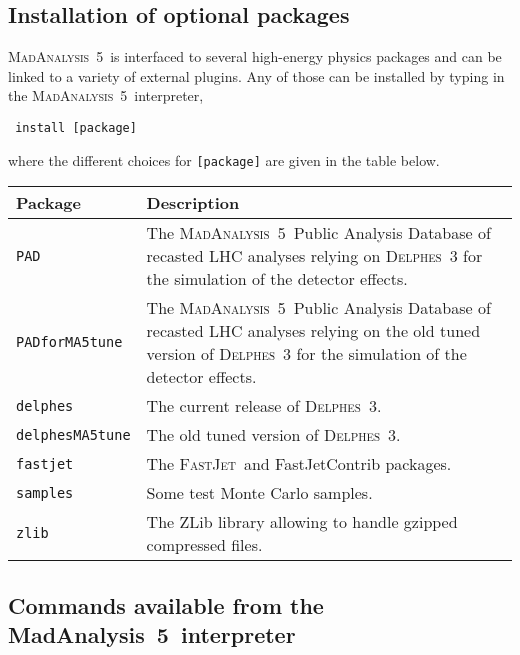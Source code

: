 \documentclass[a4paper]{article}
\newcommand{\MA}{\textsc{MadAnalysis}~5}
\newcommand{\MAnorm}{{MadAnalysis}~5}
\newcommand{\FJ}{\textsc{FastJet}}
\newcommand{\DEL}{\textsc{Delphes}}
\begin{document}
\begin{shaded}
\section{\Large Installation of optional packages}
\label{sec:install}\end{shaded}

\noindent \MA\ is interfaced to several high-energy physics packages and can be linked to
a variety of external plugins. Any of those can be installed by typing in the
\MA\ interpreter,
{\color{ao}\begin{verbatim} install [package]\end{verbatim}}
where the different choices for \verb+[package]+ are given in the table below.
\renewcommand{\arraystretch}{1.2}%
\begin{center}\begin{tabular}{l p{9.2cm}}
\hline
Package & Description\\
\hline
\color{ao} \verb?PAD?            & The \MA\ Public Analysis Database of recasted LHC
   analyses relying on \DEL~3 for the simulation of the detector effects.\\
\color{ao}\verb?PADforMA5tune?  & The \MA\ Public Analysis Database of recasted LHC
   analyses relying on the old tuned version of \DEL~3 for the simulation of the
   detector effects.\\
\color{ao}\verb?delphes?        & The current release of \DEL~3.\\
\color{ao}\verb?delphesMA5tune? & The old tuned version of \DEL~3.\\
\color{ao}\verb?fastjet?        & The \FJ\ and {\sc FastJetContrib} packages.\\
\color{ao}\verb?samples?        & Some test Monte Carlo samples.\\
\color{ao}\verb?zlib?           & The {\sc ZLib} library allowing to handle gzipped
                        compressed files.\\
\hline
\end{tabular}
\end{center}
\vspace{2cm}
\begin{shaded}
\section{\Large Commands available from the \MAnorm\ interpreter}
\end{shaded}
\end{document}
